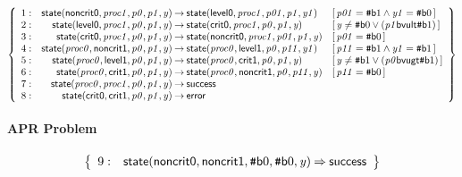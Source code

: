 \documentclass[a4paper]{article}
\newcommand{\ttsym}[1]{\mbox{\tt #1}}
\def\ttsharp{\ttsym{\symbol{35}}}
\newcommand{\symb}[1]{\mathsf{#1}}
\newcommand{\var}[1]{\mathit{#1}}
\newcommand{\Constraint}[1]{[\, #1 \,]}
\newcommand{\bv}[2][b]{{\ttsharp\symb{#1}{#2}}}
\begin{document}
\[
\left\{
\begin{array}{rr@{\>}c@{\>}ll}
\mathrm{1} : 
 & \symb{state}(\symb{noncrit0},\var{proc1},\var{p0},\var{p1},\var{y})
 & \to 
 & \symb{state}(\symb{level0},\var{proc1},\var{p01},\var{p1},\var{y1})
 & \Constraint{\var{p01} = \bv{1} \land \var{y1} = \bv{0}}\\

\mathrm{2} : 
 & \symb{state}(\symb{level0},\var{proc1},\var{p0},\var{p1},\var{y})
 & \to 
 & \symb{state}(\symb{crit0},\var{proc1},\var{p0},\var{p1},\var{y})
 & \Constraint{\var{y} \ne \bv{0} \lor (\var{p1} \symb{bvult} \bv{1})}\\

\mathrm{3} : 
 & \symb{state}(\symb{crit0},\var{proc1},\var{p0},\var{p1},\var{y})
 & \to 
 & \symb{state}(\symb{noncrit0},\var{proc1},\var{p01},\var{p1},\var{y})
 & \Constraint{\var{p01} = \bv{0}}\\

\mathrm{4} : 
 & \symb{state}(\var{proc0},\symb{noncrit1},\var{p0},\var{p1},\var{y})
 & \to 
 & \symb{state}(\var{proc0},\symb{level1},\var{p0},\var{p11},\var{y1})
 & \Constraint{\var{p11} = \bv{1} \land \var{y1} = \bv{1}}\\

\mathrm{5} : 
 & \symb{state}(\var{proc0},\symb{level1},\var{p0},\var{p1},\var{y})
 & \to 
 & \symb{state}(\var{proc0},\symb{crit1},\var{p0},\var{p1},\var{y})
 & \Constraint{\var{y} \ne \bv{1} \lor (\var{p0} \symb{bvugt} \bv{1})}\\

\mathrm{6} : 
 & \symb{state}(\var{proc0},\symb{crit1},\var{p0},\var{p1},\var{y})
 & \to 
 & \symb{state}(\var{proc0},\symb{noncrit1},\var{p0},\var{p11},\var{y})
 & \Constraint{\var{p11} = \bv{0}}\\

\mathrm{7} : 
 & \symb{state}(\var{proc0},\var{proc1},\var{p0},\var{p1},\var{y})
 & \to 
 & \symb{success}\\

\mathrm{8} : 
 & \symb{state}(\symb{crit0},\symb{crit1},\var{p0},\var{p1},\var{y})
 & \to 
 & \symb{error}\\

\end{array}
\right\}
\]



\paragraph{APR Problem}

\[
\left\{
\begin{array}{rr@{\>}c@{\>}ll}
\mathrm{9} : 
 & \symb{state}(\symb{noncrit0},\symb{noncrit1},\bv{0},\bv{0},\var{y})
 & \Rightarrow 
 & \symb{success}\\

\end{array}
\right\}
\]
\end{document}
